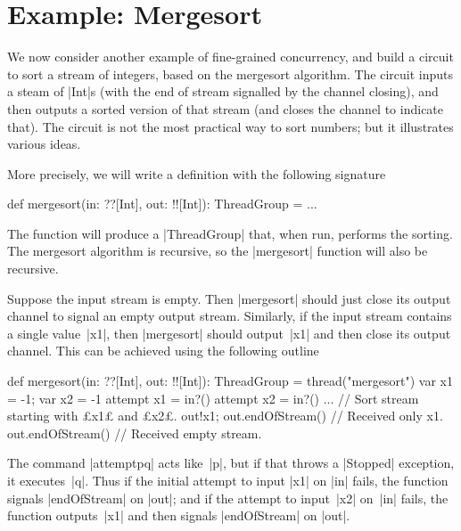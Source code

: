 \section{Example: Mergesort}

We now consider another example of fine-grained concurrency, and build a
circuit to sort a stream of integers, based on the mergesort algorithm.  The
circuit inputs a steam of |Int|s (with the end of stream signalled by the
channel closing), and then outputs a sorted version of that stream (and closes
the channel to indicate that).  The circuit is not the most practical way to
sort numbers; but it illustrates various ideas.

More precisely, we will write a  definition with the following signature
%
\begin{scala}
  def mergesort(in: ??[Int], out: !![Int]): ThreadGroup = ...
\end{scala}
%
The function will produce a |ThreadGroup| that, when run, performs the
sorting.  The mergesort algorithm is recursive, so the |mergesort| function
will also be recursive.

%


Suppose the input stream is empty.  Then |mergesort| should just close its
output channel to signal an empty output stream.  Similarly, if the input
stream contains a single value~|x1|, then |mergesort| should output~|x1| and
then close its output channel.  This can be achieved using the following
outline
\begin{scala}
  def mergesort(in: ??[Int], out: !![Int]): ThreadGroup = thread("mergesort"){
    var x1 = -1; var x2 = -1
    attempt{ 
      x1 = in?()
      attempt{
        x2 = in?()
        ...   // Sort stream starting with £x1£ and £x2£.
      }{ out!x1; out.endOfStream() } // Received only x1.
    }{ out.endOfStream() } // Received empty stream.
  }
\end{scala}
%
The command |attempt{p}{q}| acts like~|p|, but if that throws a |Stopped|
exception, it executes~|q|.  Thus if the initial attempt to input |x1| on |in|
fails, the function signals |endOfStream| on |out|; and if the attempt to
input~|x2| on~|in| fails, the function outputs~|x1| and then signals
|endOfStream| on |out|.

